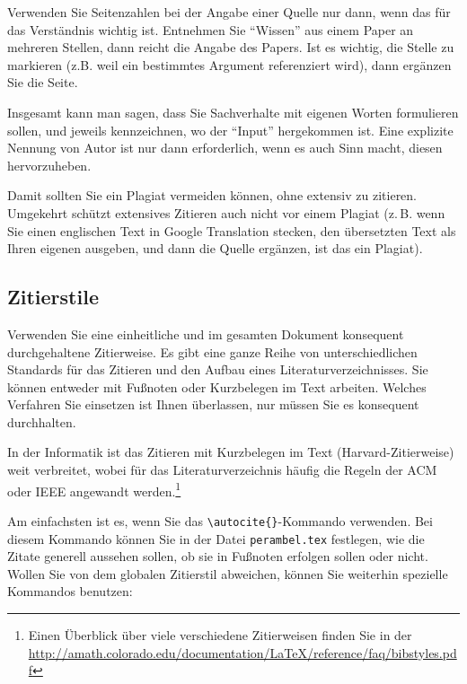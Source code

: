 \documentclass[conference,compsoc,final,a4paper]{IEEEtran}
\begin{document}
Verwenden Sie Seitenzahlen bei der Angabe einer Quelle nur dann, wenn das für das Verständnis wichtig ist. Entnehmen Sie \enquote{Wissen} aus einem Paper an mehreren Stellen, dann reicht die Angabe des Papers. Ist es wichtig, die Stelle zu markieren (z.B. weil ein bestimmtes Argument referenziert wird), dann ergänzen Sie die Seite.

Insgesamt kann man sagen, dass Sie Sachverhalte mit eigenen Worten formulieren sollen, und jeweils kennzeichnen, wo der \enquote{Input} hergekommen ist. Eine explizite Nennung von Autor ist nur dann erforderlich, wenn es auch Sinn macht, diesen hervorzuheben.

Damit sollten Sie ein Plagiat vermeiden können, ohne extensiv zu zitieren. Umgekehrt schützt extensives Zitieren auch nicht vor einem Plagiat (z.\,B. wenn Sie einen englischen Text in Google Translation stecken, den übersetzten Text als Ihren eigenen ausgeben, und dann die Quelle ergänzen, ist das ein Plagiat).

\subsection{Zitierstile}
Verwenden Sie eine einheitliche und im gesamten Dokument konsequent durchgehaltene Zitierweise. Es gibt eine ganze Reihe von unterschiedlichen Standards für das Zitieren und den Aufbau eines Literaturverzeichnisses. Sie können entweder mit Fußnoten oder Kurzbelegen im Text arbeiten. Welches Verfahren Sie einsetzen ist Ihnen überlassen, nur müssen Sie es konsequent durchhalten.

In der Informatik ist das Zitieren mit Kurzbelegen im Text (Harvard-Zitierweise) weit verbreitet, wobei für das Literaturverzeichnis häufig die Regeln der \acs{ACM} oder \acs{IEEE} angewandt werden.\footnote{Einen Überblick über viele verschiedene Zitierweisen finden Sie in der \url{http://amath.colorado.edu/documentation/LaTeX/reference/faq/bibstyles.pdf}}

Am einfachsten ist es, wenn Sie das \lstinline+\autocite{}+-Kommando verwenden. Bei diesem Kommando können Sie in der Datei \texttt{perambel.tex} festlegen, wie die Zitate generell aussehen sollen, \zb ob sie in Fußnoten erfolgen sollen oder nicht. Wollen Sie von dem globalen Zitierstil abweichen, können Sie weiterhin spezielle Kommandos benutzen:
\end{document}

